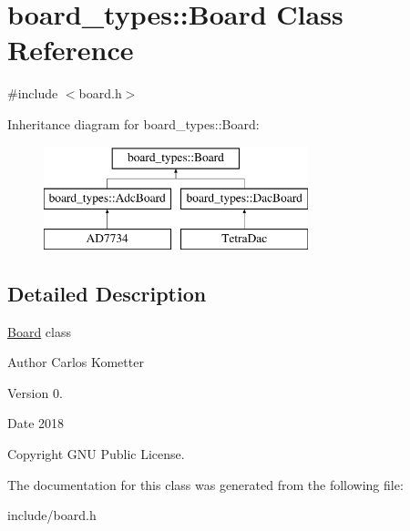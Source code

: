\hypertarget{classboard__types_1_1Board}{}\section{board\+\_\+types\+:\+:Board Class Reference}
\label{classboard__types_1_1Board}


{\ttfamily \#include $<$board.\+h$>$}

Inheritance diagram for board\+\_\+types\+:\+:Board\+:\begin{figure}[H]
\begin{center}
\leavevmode
\includegraphics[height=3.000000cm]{classboard__types_1_1Board}
\end{center}
\end{figure}


\subsection{Detailed Description}
\mbox{\hyperlink{classboard__types_1_1Board}{Board}} class \begin{DoxyAuthor}{Author}
Carlos Kometter 
\end{DoxyAuthor}
\begin{DoxyVersion}{Version}
0. 
\end{DoxyVersion}
\begin{DoxyDate}{Date}
2018 
\end{DoxyDate}
\begin{DoxyCopyright}{Copyright}
G\+NU Public License. 
\end{DoxyCopyright}


The documentation for this class was generated from the following file\+:\begin{DoxyCompactItemize}
\item 
include/board.\+h\end{DoxyCompactItemize}
